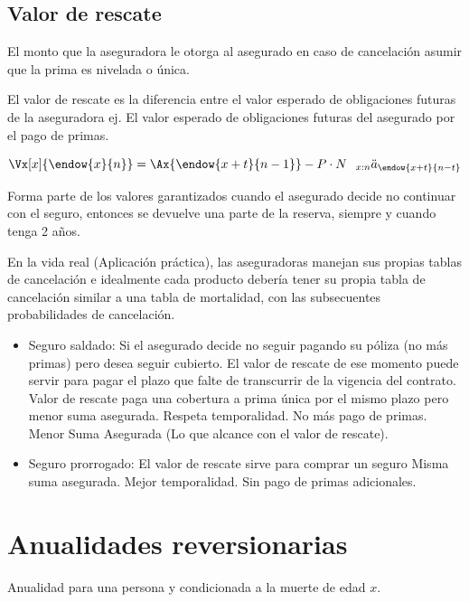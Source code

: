 \documentclass[12pt, a4paper, footinclude=true]{scrbook}
\begin{document}
	\subsection{Valor de rescate}
	
	El monto que la aseguradora le otorga al asegurado en caso de cancelación asumir que la prima es nivelada o única. 
	
	El valor de rescate es la diferencia entre el valor esperado de obligaciones futuras de la aseguradora ej. El valor esperado de obligaciones futuras del asegurado por el pago de primas. 
	
	$$ \Vx[x]{\endow{x}{n}} = \Ax{\endow{x+t}{n-1}} - P \cdot N \hspace{.25cm} _{x:n} \ddot{a}_{\endow{x+t}{n-t}}$$
	
	Forma parte de los valores garantizados cuando el asegurado decide no continuar con el seguro, entonces se devuelve una parte de la reserva, siempre y cuando tenga 2 años. 
	
	En la vida real (Aplicación práctica), las aseguradoras manejan sus propias tablas de cancelación e idealmente cada producto debería tener su propia tabla de cancelación similar a una tabla de mortalidad, con las subsecuentes probabilidades de cancelación. 
	
	\begin{itemize}
		\item Seguro saldado: Si el asegurado decide no seguir pagando su póliza (no más primas) pero desea seguir cubierto. 
		\subitem El valor de rescate de ese momento puede servir para pagar el plazo que falte de transcurrir de la vigencia del contrato. 
		\subsubitem Valor de rescate paga una cobertura a prima única por el mismo plazo pero menor suma asegurada. 
		\subitem Respeta temporalidad. 
		\subitem No más pago de primas. 
		\subitem Menor Suma Asegurada (Lo que alcance con el valor de rescate).
		\item Seguro prorrogado: El valor de rescate sirve para comprar un seguro
		\subitem Misma suma asegurada. 
		\subitem Mejor temporalidad. 
		\subitem Sin pago de primas adicionales. 
	\end{itemize}
	
	\section{Anualidades reversionarias}
	
	Anualidad para una persona y condicionada a la muerte de edad $x$. 
	
\end{document}
